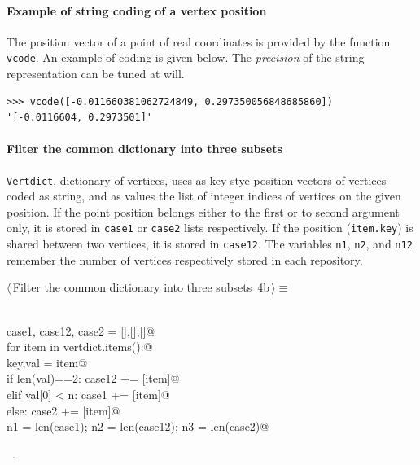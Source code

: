 \documentclass[11pt,oneside]{article}	%
\begin{document}
\paragraph{Example of string coding of a vertex position}
The position vector of a point of real coordinates is provided by the function \texttt{vcode}.
An example of coding is given below. The \emph{precision} of the string representation can be tuned at will.
{\small
\begin{verbatim}
>>> vcode([-0.011660381062724849, 0.297350056848685860])
'[-0.0116604, 0.2973501]'
\end{verbatim}}



\paragraph{Filter the common dictionary into three subsets}
\texttt{Vertdict}, dictionary of vertices, uses as key stye position vectors of vertices coded as string, and as values the list of integer indices of vertices on the given position. If the point position belongs either to the first or to second argument only, it is stored in \texttt{case1} or \texttt{case2} lists respectively. If the position (\texttt{item.key}) is shared between two vertices, it is stored in \texttt{case12}.
The variables \texttt{n1}, \texttt{n2}, and \texttt{n12} remember the number of vertices respectively stored in each repository.
\begin{flushleft} \small \label{scrap6}
\protect{}$\langle\,$Filter the common dictionary into three subsets\nobreak\ {\footnotesize 4b}$\,\rangle\equiv$
\vspace{-1ex}
\begin{list}{}{} \item
\mbox{}\verb@@\\
\mbox{}\verb@   case1, case12, case2 = [],[],[]@\\
\mbox{}\verb@   for item in vertdict.items():@\\
\mbox{}\verb@      key,val = item@\\
\mbox{}\verb@      if len(val)==2:  case12 += [item]@\\
\mbox{}\verb@      elif val[0] < n: case1 += [item]@\\
\mbox{}\verb@      else: case2 += [item]@\\
\mbox{}\verb@   n1 = len(case1); n2 = len(case12); n3 = len(case2)@\\
\mbox{}\verb@@{\NWsep}
\end{list}
\vspace{-1ex}
\footnotesize\addtolength{\baselineskip}{-1ex}
\begin{list}{}{\setlength{\itemsep}{-\parsep}\setlength{\itemindent}{-\leftmargin}}
\item \NWtxtMacroRefIn\ .
\end{list}
\end{flushleft}
\end{document}
